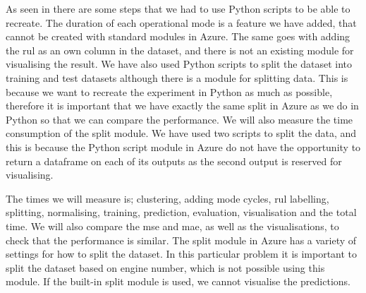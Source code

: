 \documentclass[english, a4paper]{report}
\begin{document}
{{        As seen in  there are some steps that we had to use Python scripts to be able to recreate. The duration of each operational mode is a feature we have added, that cannot be created with standard modules in Azure. The same goes with adding the \gls{rul} as an own column in the dataset, and there is not an existing module for visualising the result. We have also used Python scripts to split the dataset into training and test datasets although there is a module for splitting data. This is because we want to recreate the experiment in Python as much as possible, therefore it is important that we have exactly the same split in Azure as we do in Python so that we can compare the performance. We will also measure the time consumption of the split module. We have used two scripts to split the data, and this is because the Python script module in Azure do not have the opportunity to return a dataframe on each of its outputs as the second output is reserved for visualising. 
        \par 
        The times we will measure is; clustering, adding mode cycles, \gls{rul} labelling, splitting, normalising, training, prediction, evaluation, visualisation and the total time. We will also compare the \gls{mse} and \gls{mae}, as well as the visualisations, to check that the performance is similar. The split module in Azure has a variety of settings for how to split the dataset. In this particular problem it is important to split the dataset based on engine number, which is not possible using this module. If the built-in split module is used, we cannot visualise the predictions.
    }
}

\newpage
\end{document}
